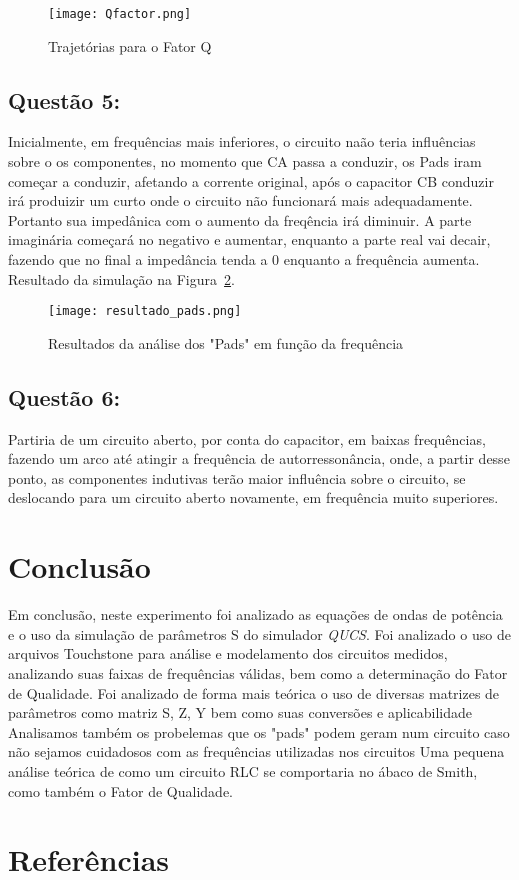 \documentclass[a4paper,12pt]{proc}
\begin{document}
\begin{figure}[htbp]
    \centering
    \texttt{[image: Qfactor.png]}
    \caption{Trajetórias para o Fator Q}
    \label{Qfactor}
\end{figure}


\subsection{Questão 5:}

Inicialmente, em frequências mais inferiores, o circuito naão teria influências sobre o os componentes, no momento que CA passa a conduzir, os Pads iram começar a conduzir, afetando a corrente original, após o capacitor CB conduzir irá produizir um curto onde o circuito não funcionará mais adequadamente. Portanto sua impedânica com o aumento da freqência irá diminuir.
\noindent A parte imaginária começará no negativo e aumentar, enquanto a parte real vai decair, fazendo que no final a impedância tenda a 0 enquanto a frequência aumenta. Resultado da simulação na Figura~\ref{pads}.

\begin{figure}[htbp]
    \centering
    \texttt{[image: resultado\_pads.png]}
    \caption{Resultados da análise dos "Pads" em função da frequência}
    \label{pads}
\end{figure}


\subsection{Questão 6:}

Partiria de um circuito aberto, por conta do capacitor, em baixas frequências, fazendo um arco até atingir a frequência de autorressonância, onde, a partir desse ponto, as componentes indutivas terão maior influência sobre o circuito, se deslocando para um circuito aberto novamente, em frequência muito superiores.

\section{Conclusão}

Em conclusão, neste experimento foi analizado as equações de ondas de potência e o uso da simulação de parâmetros S do simulador \textit{QUCS}.
\noindent Foi analizado o uso de arquivos Touchstone para análise e modelamento dos circuitos medidos, analizando suas faixas de frequências válidas, bem como a determinação do Fator de Qualidade.
\noindent Foi analizado de forma mais teórica o uso de diversas matrizes de parâmetros como matriz S, Z, Y bem como suas conversões e aplicabilidade
\noindent Analisamos também os probelemas que os "pads" podem geram num circuito caso não sejamos cuidadosos com as frequências utilizadas nos circuitos 
\noindent Uma pequena análise teórica de como um circuito RLC se comportaria no ábaco de Smith, como também o Fator de Qualidade.

\section{Referências}
\nocite{*}



\end{document}
